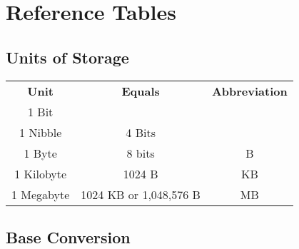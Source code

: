 \chapter{Reference Tables}\label{ch:referencetables}

\section{Units of Storage}\label{s:unitsofstorage}

\begin{center}
	\begin{tabular}{|c|c|c|}
		\hline
		\textbf{Unit} & \textbf{Equals} & \textbf{Abbreviation} \\ \hhline{|=|=|=|}
		1 Bit & & \\ \hline
		1 Nibble & 4 Bits & \\ \hline
		1 Byte & 8 bits & B  \\ \hline
		1 Kilobyte & 1024 B & KB \\ \hline
		1 Megabyte & 1024 KB or 1,048,576 B & MB \\ \hline
	\end{tabular}
\end{center}

\clearpage

\section{Base Conversion}\label{s:baseconversion}

\small

